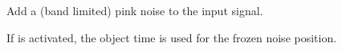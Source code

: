 Add a (band limited) pink noise to the input signal.



If  is activated, the object time is used for the
frozen noise position.

